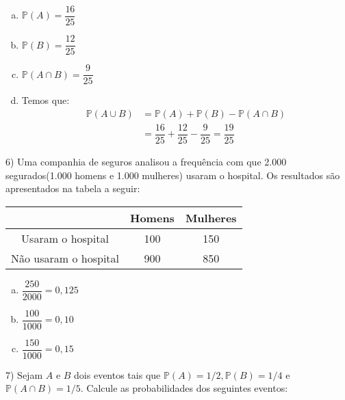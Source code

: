 \documentclass{article}
\begin{document}
\begin{enumerate}[a)]
    \item $\mathds{P}(A) = \dfrac{16}{25}$
    \item $\mathds{P}(B) = \dfrac{12}{25}$
    \item $\mathds{P}(A \cap B) = \dfrac{9}{25}$
    \item 
   Temos que:
    \begin{align*}
       \mathds{P}(A\cup B) &= \mathds{P}(A) + \mathds{P}(B) - \mathds{P}(A \cap B) \\
       &= \dfrac{16}{25} + \dfrac{12}{25} - \dfrac{9}{25} = \dfrac{19}{25}
    \end{align*}
\end{enumerate}

\vspace{5px}

6) Uma companhia de seguros analisou a frequência com que 2.000 segurados(1.000 homens e 1.000 mulheres) usaram o hospital. Os resultados são apresentados na tabela a seguir:

\begin{table}[H]
\centering
\begin{tabular}{ccc}
\hline
                      & Homens & Mulheres \\ \hline
Usaram o hospital     & 100    & 150      \\
Não usaram o hospital & 900    & 850      \\ \hline
\end{tabular}
\end{table}

\begin{enumerate}[a)] %
    \item $\dfrac{250}{2000} = 0,125$
    \item $\dfrac{100}{1000} = 0,10$
    \item $\dfrac{150}{1000} = 0,15$
\end{enumerate}

\vspace{5px}

7) Sejam $A$ e $B$ dois eventos tais que $\mathds{P}(A) = 1/2, \mathds{P}(B)=1/4$ e $\mathds{P}(A\cap B) = 1/5$. Calcule as probabilidades dos seguintes eventos:
\end{document}
